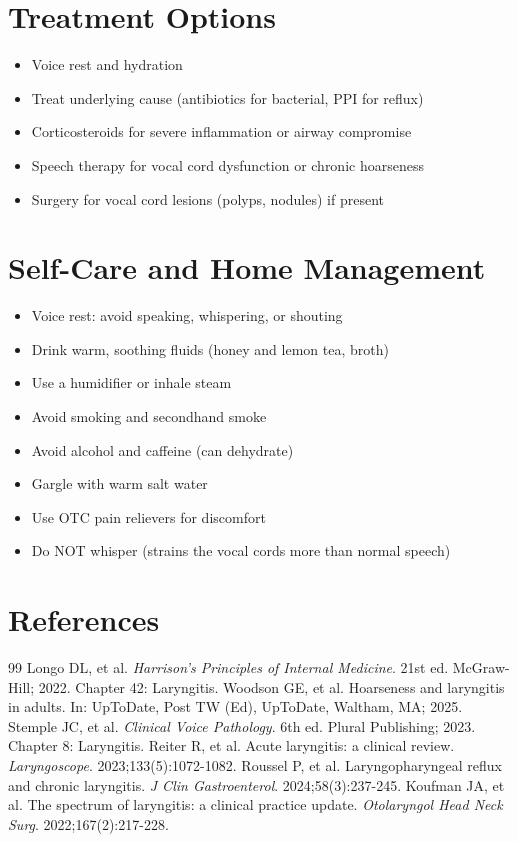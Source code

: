 \section*{Treatment Options}
\begin{itemize}
\item Voice rest and hydration
\item Treat underlying cause (antibiotics for bacterial, PPI for reflux)
\item Corticosteroids for severe inflammation or airway compromise
\item Speech therapy for vocal cord dysfunction or chronic hoarseness
\item Surgery for vocal cord lesions (polyps, nodules) if present
\end{itemize}

\section*{Self-Care and Home Management}
\begin{itemize}
\item Voice rest: avoid speaking, whispering, or shouting
\item Drink warm, soothing fluids (honey and lemon tea, broth)
\item Use a humidifier or inhale steam
\item Avoid smoking and secondhand smoke
\item Avoid alcohol and caffeine (can dehydrate)
\item Gargle with warm salt water
\item Use OTC pain relievers for discomfort
\item Do NOT whisper (strains the vocal cords more than normal speech)
\end{itemize}

\section*{References}

\begin{thebibliography}{99}
 Longo DL, et al. \emph{Harrison's Principles of Internal Medicine}. 21st ed. McGraw-Hill; 2022. Chapter 42: Laryngitis.
 Woodson GE, et al. Hoarseness and laryngitis in adults. In: UpToDate, Post TW (Ed), UpToDate, Waltham, MA; 2025.
 Stemple JC, et al. \emph{Clinical Voice Pathology}. 6th ed. Plural Publishing; 2023. Chapter 8: Laryngitis.
 Reiter R, et al. Acute laryngitis: a clinical review. \emph{Laryngoscope}. 2023;133(5):1072-1082.
 Roussel P, et al. Laryngopharyngeal reflux and chronic laryngitis. \emph{J Clin Gastroenterol}. 2024;58(3):237-245.
 Koufman JA, et al. The spectrum of laryngitis: a clinical practice update. \emph{Otolaryngol Head Neck Surg}. 2022;167(2):217-228.
\end{thebibliography}
